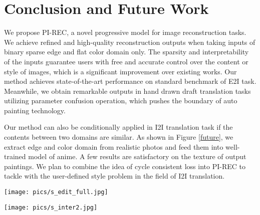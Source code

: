 \documentclass[10pt,twocolumn,letterpaper]{article} \usepackage{amsfonts,amssymb}
\begin{document}
\section{Conclusion and Future Work}
We propose PI-REC, a novel progressive model for image reconstruction tasks. We achieve refined and high-quality reconstruction outputs when taking inputs of binary sparse edge and flat color domain only. The sparsity and interpretability of the inputs guarantee users with free and accurate control over the content or style of images, which is a significant improvement over existing works. Our method achieves state-of-the-art performance on standard benchmark of E2I task. Meanwhile, we obtain remarkable outputs in hand drawn draft translation tasks utilizing parameter confusion operation, which pushes the boundary of auto painting technology.

Our method can also be conditionally applied in I2I translation task if the contents between two domains are similar. As shown in Figure \ref{future}, we extract edge and color domain from realistic photos and feed them into well-trained model of anime. A few results are satisfactory on the texture of output paintings. We plan to combine the idea of cycle consistent loss into PI-REC to tackle with the user-defined style problem in the field of I2I translation.






{\small


}

\newpage
\onecolumn
\appendix
\appendixpage
\addappheadtotoc

\begin{figure*}[h]
\centering



\texttt{[image: pics/s\_edit\_full.jpg]}

\caption{\textbf{Hand drawn draft translation.} We conduct a controlled experiment on both (i) short hair and (ii) long hair conditions, which proves that our model has a strong compatibility.}

\label{future}
\end{figure*}

\begin{figure*}[h]
\centering
\texttt{[image: pics/s\_inter2.jpg]}

\caption{\textbf{Interpolation between two color domains.} The same edge map and the interpolated color domain are taken as the input, which proves that our generator learns the color distribution from the explicit style space to generate the corresponding outputs.
}
\label{Experiment.5}
\end{figure*}
\end{document}
